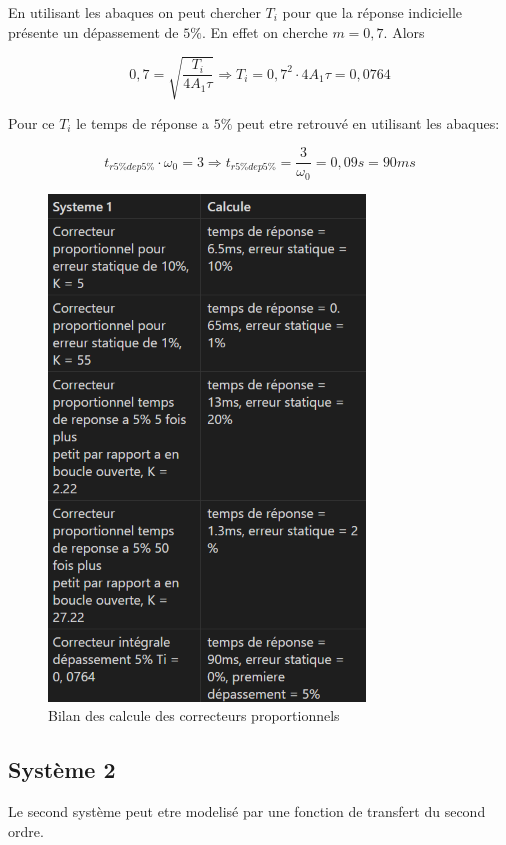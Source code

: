 \documentclass[12pt, a4paper]{report}
\begin{document}
En utilisant les abaques on peut chercher $T_i$ pour que la réponse indicielle
présente un dépassement de $5\%$. En effet on cherche $m = 0,7$. Alors

\[
    0,7 = \sqrt{\frac{T_i}{4 A_1 \tau}} \Rightarrow T_i = 0,7^2 \cdot 4 A_1 \tau = 0,0764  
\]

Pour ce $T_i$ le temps de réponse a $5\%$ peut etre retrouvé en utilisant les abaques:

\[
    t_{r5\%dep5\%} \cdot \omega_0 = 3 \Rightarrow t_{r5\%dep5\%} = \frac{3}{\omega_0} = 0,09s = 90ms
\]

\begin{figure}[H]
    \centering
    \includegraphics[width=0.75\textwidth]{bilan1.png}
    \caption{Bilan des calcule des correcteurs proportionnels}
\end{figure}

\subsection{Système 2}

Le second système peut etre modelisé par une fonction de transfert du second ordre.
\end{document}
